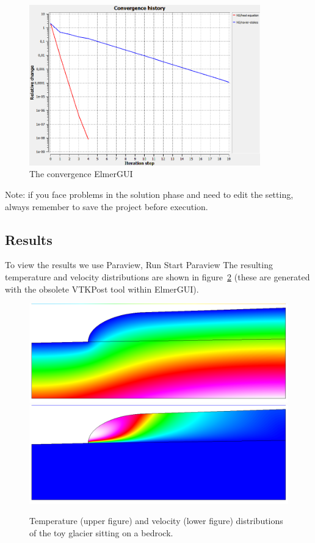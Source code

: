 \begin{figure}
\begin{center}
\includegraphics[width=100mm]{glacier_and_bedrock_toy_convergence}
\caption{The convergence  ElmerGUI}\label{glacrock:conv}
\end{center}
\end{figure}

Note: if you face problems in the solution phase and need to edit the setting, always remember to save
the project before execution.

\subsection*{Results}

To view the results we use Paraview,
\ttbegin
Run
  Start Paraview
\ttend
The resulting temperature and velocity distributions are shown in figure~\ref{glacrock:figtemp} (these are generated with the obsolete VTKPost tool within ElmerGUI).

\begin{figure}
\begin{center}
\includegraphics[width=120mm]{glacier_and_bedrock_toy_temp}
\includegraphics[width=120mm]{glacier_and_bedrock_toy_velo}
\caption{Temperature (upper figure) and velocity (lower figure) distributions 
of the toy glacier sitting on a bedrock.}\label{glacrock:figtemp}
\end{center}
\end{figure}


